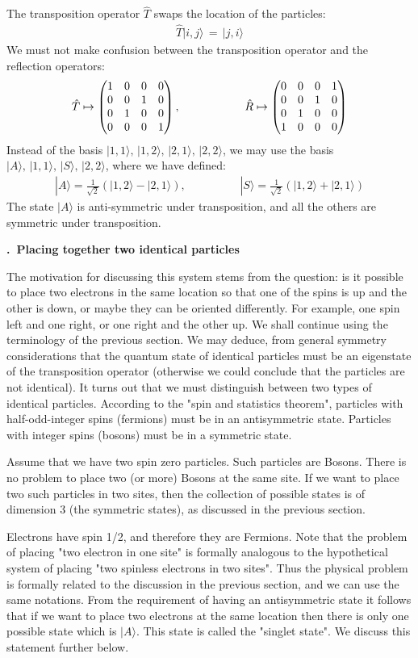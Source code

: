 \documentclass[onecolumn,fleqn, 11pt]{revtex4}
\newcommand{\amatrix}[1]{\begin{matrix} #1 \end{matrix}}
\newcommand{\beq}{\begin{eqnarray}}
\newcommand{\eeq}{\end{eqnarray}}
\renewcommand{\thesubsection}{\arabic{subsection}}
\renewcommand{\thesubsubsection}{\arabic{subsubsection}}
\newcommand{\sheadC}[1]
{
\addtocounter{subsubsection}{1}
\vspace{5mm}
{\bf \thesubsection.\thesubsubsection \ #1}  
\nopagebreak
\phantomsection
}
\begin{document}
The transposition operator ${\hat{T}}$ swaps the location of the particles:
\beq
\hat{T}|i,j\rangle \, = \, |j,i\rangle
\eeq
We must not make confusion between 
the transposition operator and the reflection operators:
\beq
\hat{T} \mapsto 
\left(
\amatrix{1 & 0 & 0 & 0 \cr 0 & 0 & 1 & 0 \cr 0 & 1 & 0 & 0 \cr 0 & 0 & 0 & 1 } 
\right), 
\hspace{2cm} 
\hat{R} \mapsto 
\left(
\amatrix{0 & 0 & 0 & 1 \cr 0 & 0 & 1 & 0 \cr 0 & 1 & 0 & 0 \cr 1 & 0 & 0 & 0 }
\right) 
\eeq
Instead of the basis ${|1,1\rangle, \, |1,2\rangle, \, |2,1\rangle, \, |2,2\rangle}$, 
we may use the basis ${|A\rangle, \, |1,1\rangle, \, |S\rangle, \, |2,2\rangle}$, 
where we have defined:
\beq
|A\rangle=\frac{1}{\sqrt{2}}\left(|1,2\rangle-|2,1\rangle\right),
\hspace{2cm} 
|S\rangle=\frac{1}{\sqrt{2}}\left(|1,2\rangle+|2,1\rangle\right) 
\eeq
The state ${|A\rangle}$ is anti-symmetric under transposition, 
and all the others are symmetric under transposition. 



 
\sheadC{Placing together two identical particles}

The motivation for discussing this system stems from the 
question: is it possible to place two electrons in the 
same location so that one of the spins is up and the other 
is down, or maybe they can be oriented differently. 
For example, one spin left and one right, or one right 
and the other up. We shall continue using the 
terminology of the previous section. We may deduce, 
from general symmetry considerations that the quantum 
state of identical particles must be an eigenstate of 
the transposition operator (otherwise we could 
conclude that the particles are not identical). 
It turns out that we must distinguish between two 
types of identical particles. According to the "spin 
and statistics theorem", particles with half-odd-integer 
spins (fermions) must be in an antisymmetric state. 
Particles with integer spins (bosons) must be in a symmetric state.  

Assume that we have two spin zero particles. 
Such particles are Bosons. There is no problem 
to place two (or more) Bosons at the same site. 
If we want to place two such particles in two sites, 
then the collection of possible states is 
of dimension 3 (the symmetric states), as 
discussed in the previous section.


Electrons have spin 1/2, and therefore they are Fermions.
Note that the problem of placing "two electron in one site" 
is formally analogous to the hypothetical system 
of placing "two spinless electrons in two sites".   
Thus the physical problem is formally related to 
the discussion in the previous section, and we can 
use the same notations. From the requirement of 
having an antisymmetric state it follows that 
if we want to place two electrons at the same location 
then there is only one possible state which is ${|A\rangle}$. 
This state is called the "singlet state". 
We discuss this statement further below. 
\end{document}
